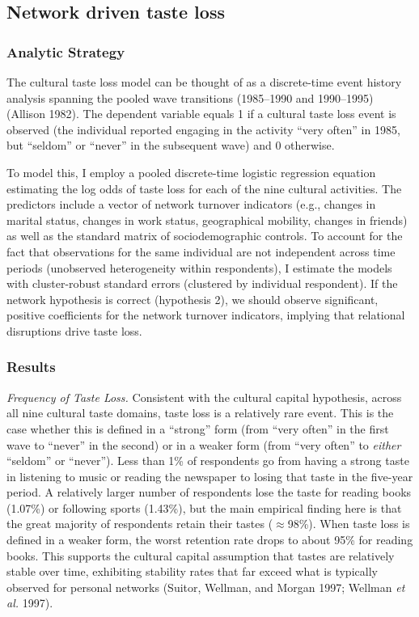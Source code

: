\documentclass[
]{article}
\begin{document}
\subsection{Network driven taste loss}\label{network-driven-taste-loss}

\subsubsection{Analytic Strategy}\label{analytic-strategy}

The cultural taste loss model can be thought of as a discrete-time event history analysis spanning the pooled wave transitions (1985--1990 and 1990--1995) (Allison 1982). The dependent variable equals 1 if a cultural taste loss event is observed (the individual reported engaging in the activity ``very often'' in 1985, but ``seldom'' or ``never'' in the subsequent wave) and 0 otherwise. 

To model this, I employ a pooled discrete-time logistic regression equation estimating the log odds of taste loss for each of the nine cultural activities. The predictors include a vector of network turnover indicators (e.g., changes in marital status, changes in work status, geographical mobility, changes in friends) as well as the standard matrix of sociodemographic controls. To account for the fact that observations for the same individual are not independent across time periods (unobserved heterogeneity within respondents), I estimate the models with cluster-robust standard errors (clustered by individual respondent). If the network hypothesis is correct (hypothesis 2), we should observe significant, positive coefficients for the network turnover indicators, implying that relational disruptions drive taste loss.

\subsubsection{Results}\label{results}

\emph{Frequency of Taste Loss.} Consistent with the cultural capital hypothesis, across all nine cultural taste domains, taste loss is a relatively rare event. This is the case whether this is defined in a ``strong'' form (from ``very often'' in the first wave to ``never'' in the second) or in a weaker form (from ``very often'' to \emph{either} ``seldom'' or ``never''). Less than 1\% of respondents go from having a strong taste in listening to music or reading the newspaper to losing that taste in the five-year period. A relatively larger number of respondents lose the taste for reading books (1.07\%) or following sports (1.43\%), but the main empirical finding here is that the great majority of respondents retain their tastes ($\approx$98\%). When taste loss is defined in a weaker form, the worst retention rate drops to about 95\% for reading books. This supports the cultural capital assumption that tastes are relatively stable over time, exhibiting stability rates that far exceed what is typically observed for personal networks (Suitor, Wellman, and Morgan 1997; Wellman \emph{et al.} 1997).
\end{document}
